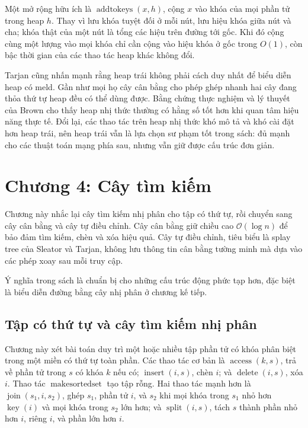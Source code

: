 \documentclass[11pt]{article}
\newcommand{\Oh}{\mathcal{O}}
\begin{document}
Một mở rộng hữu ích là \(\operatorname{addtokeys}(x,h)\), cộng \(x\) vào khóa
của mọi phần tử trong heap \(h\). Thay vì lưu khóa tuyệt đối ở mỗi nút, lưu hiệu
khóa giữa nút và cha; khóa thật của một nút là tổng các hiệu trên đường tới gốc.
Khi đó cộng cùng một lượng vào mọi khóa chỉ cần cộng vào hiệu khóa ở gốc trong
\(O(1)\), còn bậc thời gian của các thao tác heap khác không đổi.

Tarjan cũng nhấn mạnh rằng heap trái không phải cách duy nhất để biểu diễn heap
có meld. Gần như mọi họ cây cân bằng cho phép ghép nhanh hai cây đang thỏa thứ
tự heap đều có thể dùng được. Bằng chứng thực nghiệm và lý thuyết của Brown
cho thấy heap nhị thức thường có hằng số tốt hơn khi quan tâm hiệu năng thực
tế. Đổi lại, các thao tác trên heap nhị thức khó mô tả và khó cài đặt hơn heap
trái, nên heap trái vẫn là lựa chọn sư phạm tốt trong sách: đủ mạnh cho các
thuật toán mạng phía sau, nhưng vẫn giữ được cấu trúc đơn giản.

\section{Chương 4: Cây tìm kiếm}

Chương này nhắc lại cây tìm kiếm nhị phân cho tập có thứ tự, rồi chuyển sang
cây cân bằng và cây tự điều chỉnh. Cây cân bằng giữ chiều cao \(\Oh(\log n)\)
để bảo đảm tìm kiếm, chèn và xóa hiệu quả. Cây tự điều chỉnh, tiêu biểu là
splay tree của Sleator và Tarjan, không lưu thông tin cân bằng tường minh mà
dựa vào các phép xoay sau mỗi truy cập.

Ý nghĩa trong sách là chuẩn bị cho những cấu trúc động phức tạp hơn, đặc biệt
là biểu diễn đường bằng cây nhị phân ở chương kế tiếp.

\subsection*{Tập có thứ tự và cây tìm kiếm nhị phân}

Chương này xét bài toán duy trì một hoặc nhiều tập phần tử có khóa phân biệt
trong một miền có thứ tự toàn phần. Các thao tác cơ bản là
\(\operatorname{access}(k,s)\), trả về phần tử trong \(s\) có khóa \(k\) nếu có;
\(\operatorname{insert}(i,s)\), chèn \(i\); và \(\operatorname{delete}(i,s)\),
xóa \(i\). Thao tác \(\operatorname{makesortedset}\) tạo tập rỗng. Hai thao tác
mạnh hơn là \(\operatorname{join}(s_1,i,s_2)\), ghép \(s_1\), phần tử \(i\), và
\(s_2\) khi mọi khóa trong \(s_1\) nhỏ hơn \(\operatorname{key}(i)\) và mọi khóa
trong \(s_2\) lớn hơn; và \(\operatorname{split}(i,s)\), tách \(s\) thành phần
nhỏ hơn \(i\), riêng \(i\), và phần lớn hơn \(i\).
\end{document}
